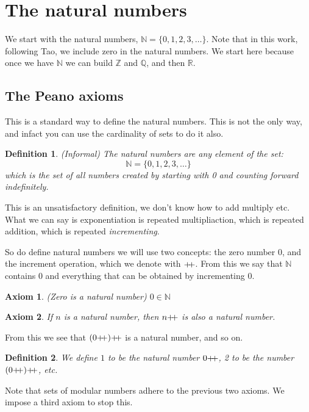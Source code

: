 \documentclass{article}
\newtheorem{definition}{Definition}[subsection]
\newtheorem{axiom}{Axiom}[section]
\newcommand{\N}{\mathbb{N}}
\newcommand{\pp}{\mathbin{+\mkern-5mu+}}
\let\it\textit
\begin{document}
\newpage 

\section{The natural numbers}

We start with the natural numbers, $\mathbb{N} = \{0, 1, 2, 3, \ldots\}$.
Note that in this work, following Tao, we include zero in the natural numbers.
We start here because once we have $\mathbb{N}$ we can build 
$\mathbb{Z}$ and $\mathbb{Q}$, and then $\mathbb{R}$.

\subsection{The Peano axioms}

This is a standard way to define the natural numbers. This is not
the only way, and infact you can use the cardinality of sets 
to do it also.

\begin{definition}
	(Informal) The natural numbers are any element of the set: 
	$$
	\N = \{0, 1, 2, 3, \ldots\}
	$$
	which is the set of all numbers created by starting with 0 
	and counting forward indefinitely.
\end{definition}

This is an unsatisfactory definition, we don't know how to add
multiply etc.
What we can say is exponentiation is repeated multipliaction, 
which is repeated addition, which is repeated \it{incrementing}.

So do define natural numbers we will use two concepts: the zero number 
$0$, and the increment operation, which we denote with $\pp$. From this 
we say that $\N$ contains $0$ and everything that can be obtained 
by incrementing $0$.

\begin{axiom}
	(Zero is a natural number) $0 \in \N$	
\end{axiom}
\begin{axiom}
	If $n$ is a natural number, then $n\pp$ is also a natural number.
\end{axiom}

From this we see that $(0 \pp)\pp$ is a natural number, and so on. 

\begin{definition}
	We define $1$ to be the natural number $0\pp$, 2 to be 
	the number $(0\pp)\pp$, etc.
\end{definition}

Note that sets of modular numbers adhere to the previous two axioms.
We impose a third axiom to stop this.
\end{document}
